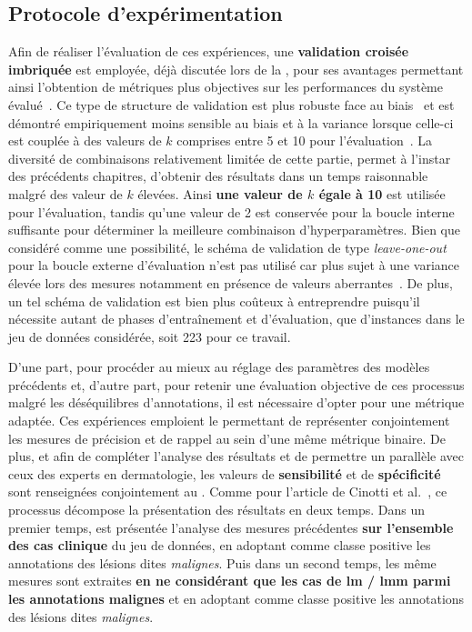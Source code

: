 \subsection{Protocole d’expérimentation}
Afin de réaliser l'évaluation de ces expériences, une \textbf{validation croisée imbriquée} est employée, déjà discutée lors de la , pour ses avantages permettant ainsi l'obtention de métriques plus objectives sur les performances du système évalué~\cite{Cawley2010}. Ce type de structure de validation est plus robuste face au biais~\cite{Cawley2010} et est démontré empiriquement moins sensible au biais et à la variance lorsque celle-ci est couplée à des valeurs de $k$ comprises entre 5 et 10 pour l'évaluation~\cite{James2000}. La diversité de combinaisons relativement limitée de cette partie, permet à l'instar des précédents chapitres, d'obtenir des résultats dans un temps raisonnable malgré des valeur de $k$ élevées. Ainsi \textbf{une valeur de $k$ égale à 10} est utilisée pour l'évaluation, tandis qu'une valeur de 2 est conservée pour la boucle interne suffisante pour déterminer la meilleure combinaison d'hyperparamètres. Bien que considéré comme une possibilité, le schéma de validation de type \textit{leave-one-out} pour la boucle externe d'évaluation n'est pas utilisé car plus sujet à une variance élevée lors des mesures notamment en présence de valeurs aberrantes~\cite{Bengio2004}. De plus, un tel schéma de validation est bien plus coûteux à entreprendre puisqu'il nécessite autant de phases d'entraînement et d'évaluation, que d'instances dans le jeu de données considérée, soit 223 pour ce travail.\par

D'une part, pour procéder au mieux au réglage des paramètres des modèles précédents et, d'autre part, pour retenir une évaluation objective de ces processus malgré les déséquilibres d'annotations, il est nécessaire d'opter pour une métrique adaptée. Ces expériences emploient le \textbf{\fscore{}} permettant de représenter conjointement les mesures de précision et de rappel au sein d'une même métrique binaire. De plus, et afin de compléter l'analyse des résultats et de permettre un parallèle avec ceux des experts en dermatologie, les valeurs de \textbf{sensibilité} et de \textbf{spécificité} sont renseignées conjointement au \fscore{}. Comme pour l'article de Cinotti et al.~\cite{Cinotti2016}, ce processus décompose la présentation des résultats en deux temps. Dans un premier temps, est présentée l'analyse des mesures précédentes \textbf{sur l'ensemble des cas clinique} du jeu de données, en adoptant comme classe positive les annotations des lésions dites \textit{malignes}. Puis dans un second temps, les même mesures sont extraites \textbf{en ne considérant que les cas de \textbf{\gls{lm} / \gls{lmm}} parmi les annotations malignes} et en adoptant comme classe positive les annotations des lésions dites \textit{malignes}.\par

